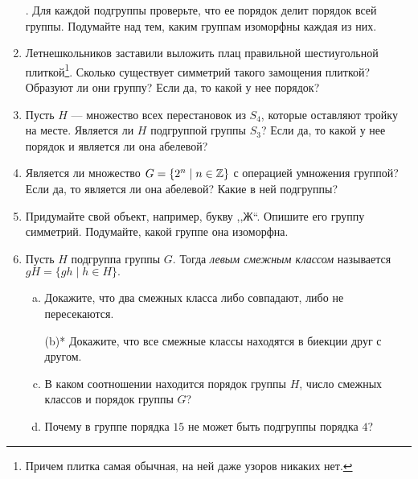 \begin{enumerate}
.
    Для каждой подгруппы проверьте, что ее порядок делит порядок всей группы. Подумайте над тем, каким группам изоморфны каждая из них.
\item Летнешкольников заставили выложить плац правильной шестиугольной плиткой\footnote{Причем плитка самая обычная, на ней даже узоров никаких нет.}. Сколько существует симметрий такого замощения плиткой? Образуют ли они группу?
        Если да, то какой у нее порядок?
    \item Пусть $H$ --- множество всех перестановок из $S_4$, которые оставляют
        тройку на месте. Является ли $H$ подгруппой группы $S_3$?
        Если да, то какой у нее порядок и является ли она абелевой?
    \item Является ли множество $G = \{2^n \mid n \in \mathbb Z\}$ с операцией умножения группой?
        Если да, то является ли она абелевой? Какие в ней подгруппы?
    \item Придумайте свой объект, например, букву ,,Ж``. Опишите его группу симметрий. Подумайте, какой группе она изоморфна.
    \item Пусть $H$ подгруппа группы $G$. Тогда \emph{левым смежным классом} называется \(gH =\{gh \mid h \in H\}.\)
        \begin{enumerate}[(a)]
        \item Докажите, что два смежных класса либо совпадают, либо не пересекаются.
        \item[(b)*] Докажите, что все смежные классы находятся в биекции друг с другом.
        \addtocounter{enumii}{1}
        \item В каком соотношении находится порядок группы $H$, число смежных классов и порядок группы $G$?
        \item Почему в группе порядка $15$ не может быть подгруппы порядка $4$?
        \end{enumerate}
\end{enumerate}
